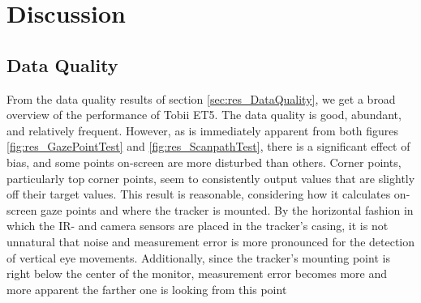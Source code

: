 \section{Discussion}



\subsection{Data Quality}

From the data quality results of section \ref{sec:res_DataQuality}, we get a broad overview of the performance of Tobii ET5. The data quality is good, abundant, and relatively frequent. However, as is immediately apparent from both figures \ref{fig:res_GazePointTest} and \ref{fig:res_ScanpathTest}, there is a significant effect of bias, and some points on-screen are more disturbed than others. Corner points, particularly top corner points, seem to consistently output values that are slightly off their target values. This result is reasonable, considering how it calculates on-screen gaze points and where the tracker is mounted. By the horizontal fashion in which the IR- and camera sensors are placed in the tracker's casing, it is not unnatural that noise and measurement error is more pronounced for the detection of vertical eye movements. Additionally, since the tracker's mounting point is right below the center of the monitor, measurement error becomes more and more apparent the farther one is looking from this point

